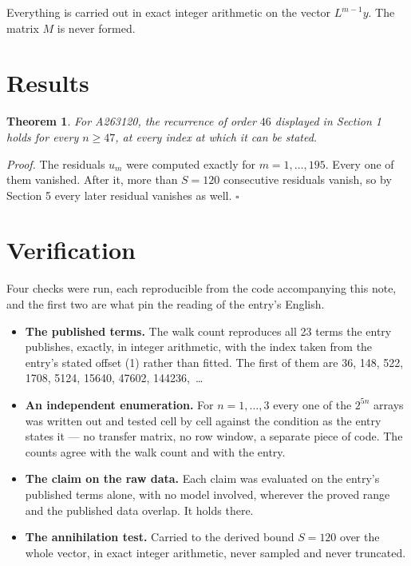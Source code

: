 \documentclass[11pt]{article}
\newtheorem{theorem}{Theorem}
\theoremstyle{definition}
\begin{document}
Everything is carried out in exact integer arithmetic on the vector $L^{m-1}y$. The matrix $M$ is never formed.

\section{Results}

\begin{theorem} For A263120, the recurrence of order $46$ displayed in Section 1 holds for every $n \ge 47$, at every index at which it can be stated.\end{theorem}

{\itshape Proof.} The residuals $u_m$ were computed exactly for $m = 1,\dots,195$. Every one of them vanished. After it, more than $S = 120$ consecutive residuals vanish, so by Section 5 every later residual vanishes as well. $\square$

\section{Verification}

Four checks were run, each reproducible from the code accompanying this note, and the first two are what pin the reading of the entry's English.

\begin{itemize}

\item {\bfseries The published terms.} The walk count reproduces all 23 terms the entry publishes, exactly, in integer arithmetic, with the index taken from the entry's stated offset (1) rather than fitted. The first of them are 36, 148, 522, 1708, 5124, 15640, 47602, 144236,~\dots

\item {\bfseries An independent enumeration.} For $n = 1,\dots,3$ every one of the $2^{5n}$ arrays was written out and tested cell by cell against the condition as the entry states it --- no transfer matrix, no row window, a separate piece of code. The counts agree with the walk count and with the entry.

\item {\bfseries The claim on the raw data.} Each claim was evaluated on the entry's published terms alone, with no model involved, wherever the proved range and the published data overlap. It holds there.

\item {\bfseries The annihilation test.} Carried to the derived bound $S = 120$ over the whole vector, in exact integer arithmetic, never sampled and never truncated.

\end{itemize}
\end{document}
